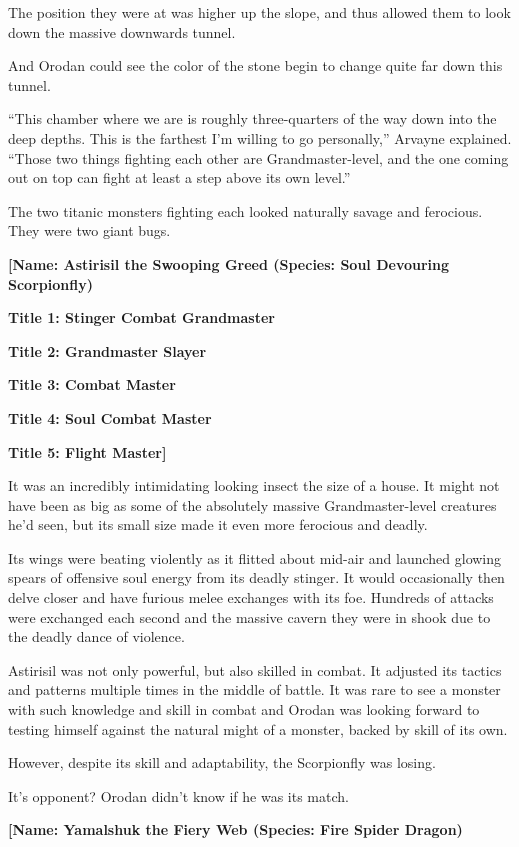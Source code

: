 \documentclass[a4paper,10pt]{book}
\begin{document}
The position they were at was higher up the slope, and thus allowed them to look down the massive downwards tunnel.\par
And Orodan could see the color of the stone begin to change quite far down this tunnel.\par
“This chamber where we are is roughly three-quarters of the way down into the deep depths. This is the farthest I’m willing to go personally,” Arvayne explained. “Those two things fighting each other are Grandmaster-level, and the one coming out on top can fight at least a step above its own level.”\par
The two titanic monsters fighting each looked naturally savage and ferocious. They were two giant bugs.\par
\textbf{[Name: Astirisil the Swooping Greed (Species: Soul Devouring Scorpionfly)}\par
\textbf{Title 1: Stinger Combat Grandmaster}\par
\textbf{Title 2: Grandmaster Slayer}\par
\textbf{Title 3: Combat Master}\par
\textbf{Title 4: Soul Combat Master}\par
\textbf{Title 5: Flight Master]}\par
It was an incredibly intimidating looking insect the size of a house. It might not have been as big as some of the absolutely massive Grandmaster-level creatures he’d seen, but its small size made it even more ferocious and deadly.\par
Its wings were beating violently as it flitted about mid-air and launched glowing spears of offensive soul energy from its deadly stinger. It would occasionally then delve closer and have furious melee exchanges with its foe. Hundreds of attacks were exchanged each second and the massive cavern they were in shook due to the deadly dance of violence.\par
Astirisil was not only powerful, but also skilled in combat. It adjusted its tactics and patterns multiple times in the middle of battle. It was rare to see a monster with such knowledge and skill in combat and Orodan was looking forward to testing himself against the natural might of a monster, backed by skill of its own.\par
However, despite its skill and adaptability, the Scorpionfly was losing.\par
It’s opponent? Orodan didn’t know if he was its match.\par
\textbf{[Name: Yamalshuk the Fiery Web (Species: Fire Spider Dragon)}\par
\end{document}
